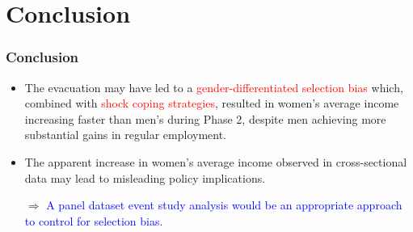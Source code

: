 \documentclass[serif, aspectratio=169]{beamer}
\begin{document}
\section{Conclusion}

\begin{frame}[label=summary]
\frametitle{Conclusion}





{\Large
\begin{itemize}

\item The evacuation may have led to a \textcolor{red}{gender-differentiated selection bias} which, combined with \textcolor{red}{shock coping strategies}, resulted in women's average income increasing faster than men's during Phase 2, despite men achieving more substantial gains in regular employment.

\item The apparent increase in women's average income observed in cross-sectional data may lead to misleading policy implications.

  \vspace{0.3cm}
  \hspace{1cm} $\Rightarrow$ \textcolor{blue}{A panel dataset event study analysis would be an appropriate approach to control for selection bias.}
\end{itemize}
}
\end{frame}
\end{document}
